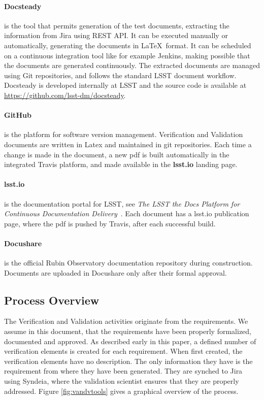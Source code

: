 \paragraph{Docsteady}
is the tool that permits generation of the test documents, extracting the information from Jira using REST API.
It can be executed manually or automatically, generating the documents in \LaTeX~format.
It can be scheduled on a continuous integration tool like for example Jenkins, making possible that 
the documents are generated continuously.
The extracted documents are managed using Git repositories, and follows the  standard LSST document workflow.
Docsteady is developed internally at LSST and the source code is available at \url{https://github.com/lsst-dm/docsteady}.

\paragraph{GitHub}
is the platform for software version management.
Verification and Validation documents are written in Latex and maintained in git repositories.
Each time a change is made in the document, a new pdf is built automatically in the integrated Travis platform, and made available in the \textbf{lsst.io} landing page.

\paragraph{lsst.io}
is the documentation portal for LSST, see \textit{The LSST the Docs Platform for Continuous Documentation Delivery}\cite{SQR-006}~.
Each document has a lsst.io publication page, where the pdf is pushed by Travis, after each successful build.

\paragraph{Docushare}
is the official Rubin Observatory documentation repository during construction.
Documents are uploaded in Docushare only after their formal approval.


\subsection{Process Overview}

The Verification and Validation activities originate from the requirements.
We assume in this document, that the requirements have been properly formalized, documented and approved.
As described early in this paper, a defined number of verification elements is created for each requirement.
When first created, the verification elements have no description. The only information they have is the requirement from where they have been generated.
They are synched to Jira using Syndeia, where the validation scientist ensures that they are properly addressed.
Figure  \ref{fig:vandvtools} gives a graphical overview of the process.


